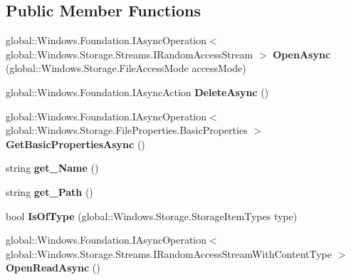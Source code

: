 \subsection*{Public Member Functions}
\begin{DoxyCompactItemize}
\item 
\mbox{\label{class_windows_1_1_storage_1_1_storage_file_a29ee2f060ba92e79eabded8b48966776}} 
global\+::\+Windows.\+Foundation.\+I\+Async\+Operation$<$ global\+::\+Windows.\+Storage.\+Streams.\+I\+Random\+Access\+Stream $>$ {\bfseries Open\+Async} (global\+::\+Windows.\+Storage.\+File\+Access\+Mode access\+Mode)
\item 
\mbox{\label{class_windows_1_1_storage_1_1_storage_file_a6d0d928c1dc9abd71b250099c2de27f1}} 
global\+::\+Windows.\+Foundation.\+I\+Async\+Action {\bfseries Delete\+Async} ()
\item 
\mbox{\label{class_windows_1_1_storage_1_1_storage_file_acf51ed8048b0f4497f173a6c8addf43f}} 
global\+::\+Windows.\+Foundation.\+I\+Async\+Operation$<$ global\+::\+Windows.\+Storage.\+File\+Properties.\+Basic\+Properties $>$ {\bfseries Get\+Basic\+Properties\+Async} ()
\item 
\mbox{\label{class_windows_1_1_storage_1_1_storage_file_a7a2ef38514c8d6dc439918de9aa6feb7}} 
string {\bfseries get\+\_\+\+Name} ()
\item 
\mbox{\label{class_windows_1_1_storage_1_1_storage_file_ad961bebed52f4f6b04a97201c511e841}} 
string {\bfseries get\+\_\+\+Path} ()
\item 
\mbox{\label{class_windows_1_1_storage_1_1_storage_file_aab7da0a2a5ea0ef0219616c0ebbf92e7}} 
bool {\bfseries Is\+Of\+Type} (global\+::\+Windows.\+Storage.\+Storage\+Item\+Types type)
\item 
\mbox{\label{class_windows_1_1_storage_1_1_storage_file_a35c626039408667e2520e113fb58342d}} 
global\+::\+Windows.\+Foundation.\+I\+Async\+Operation$<$ global\+::\+Windows.\+Storage.\+Streams.\+I\+Random\+Access\+Stream\+With\+Content\+Type $>$ {\bfseries Open\+Read\+Async} ()

\end{DoxyCompactItemize}
